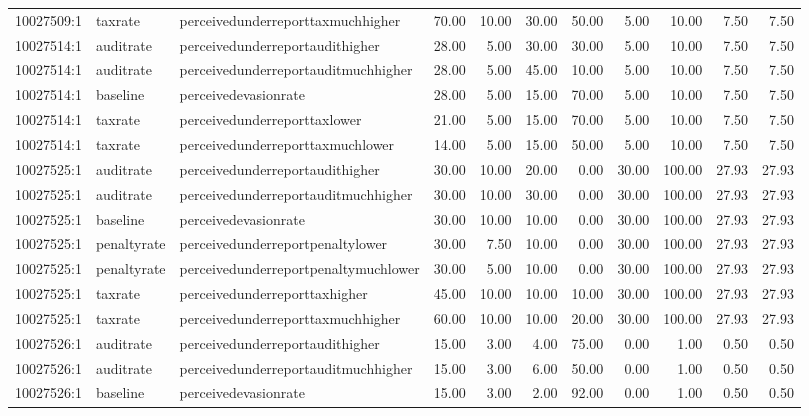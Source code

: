 \begin{table}[ht]
\begin{tabular}{lllrrrrrrrr}
  10027509:1 & taxrate & perceivedunderreporttaxmuchhigher & 70.00 & 10.00 & 30.00 & 50.00 & 5.00 & 10.00 & 7.50 & 7.50 \\ 
  10027514:1 & auditrate & perceivedunderreportaudithigher & 28.00 & 5.00 & 30.00 & 30.00 & 5.00 & 10.00 & 7.50 & 7.50 \\ 
  10027514:1 & auditrate & perceivedunderreportauditmuchhigher & 28.00 & 5.00 & 45.00 & 10.00 & 5.00 & 10.00 & 7.50 & 7.50 \\ 
  10027514:1 & baseline & perceivedevasionrate & 28.00 & 5.00 & 15.00 & 70.00 & 5.00 & 10.00 & 7.50 & 7.50 \\ 
  10027514:1 & taxrate & perceivedunderreporttaxlower & 21.00 & 5.00 & 15.00 & 70.00 & 5.00 & 10.00 & 7.50 & 7.50 \\ 
  10027514:1 & taxrate & perceivedunderreporttaxmuchlower & 14.00 & 5.00 & 15.00 & 50.00 & 5.00 & 10.00 & 7.50 & 7.50 \\ 
  10027525:1 & auditrate & perceivedunderreportaudithigher & 30.00 & 10.00 & 20.00 & 0.00 & 30.00 & 100.00 & 27.93 & 27.93 \\ 
  10027525:1 & auditrate & perceivedunderreportauditmuchhigher & 30.00 & 10.00 & 30.00 & 0.00 & 30.00 & 100.00 & 27.93 & 27.93 \\ 
  10027525:1 & baseline & perceivedevasionrate & 30.00 & 10.00 & 10.00 & 0.00 & 30.00 & 100.00 & 27.93 & 27.93 \\ 
  10027525:1 & penaltyrate & perceivedunderreportpenaltylower & 30.00 & 7.50 & 10.00 & 0.00 & 30.00 & 100.00 & 27.93 & 27.93 \\ 
  10027525:1 & penaltyrate & perceivedunderreportpenaltymuchlower & 30.00 & 5.00 & 10.00 & 0.00 & 30.00 & 100.00 & 27.93 & 27.93 \\ 
  10027525:1 & taxrate & perceivedunderreporttaxhigher & 45.00 & 10.00 & 10.00 & 10.00 & 30.00 & 100.00 & 27.93 & 27.93 \\ 
  10027525:1 & taxrate & perceivedunderreporttaxmuchhigher & 60.00 & 10.00 & 10.00 & 20.00 & 30.00 & 100.00 & 27.93 & 27.93 \\ 
  10027526:1 & auditrate & perceivedunderreportaudithigher & 15.00 & 3.00 & 4.00 & 75.00 & 0.00 & 1.00 & 0.50 & 0.50 \\ 
  10027526:1 & auditrate & perceivedunderreportauditmuchhigher & 15.00 & 3.00 & 6.00 & 50.00 & 0.00 & 1.00 & 0.50 & 0.50 \\ 
  10027526:1 & baseline & perceivedevasionrate & 15.00 & 3.00 & 2.00 & 92.00 & 0.00 & 1.00 & 0.50 & 0.50 \\ 

\end{tabular}
\end{table}
